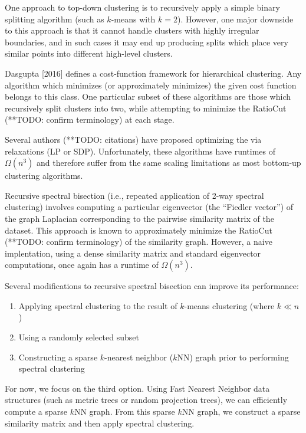 \documentclass[11pt]{article}
\begin{document}
One approach to top-down clustering is to recursively apply a simple binary splitting algorithm (such as $k$-means with $k=2$).
However, one major downside to this approach is that it cannot handle clusters with highly irregular boundaries, and in such cases it may end up producing splits which place very similar points into different high-level clusters.

Dasgupta [2016] defines a cost-function framework for hierarchical clustering.
Any algorithm which minimizes (or approximately minimizes) the given cost function belongs to this class.
One particular subset of these algorithms are those which recursively split clusters into two, while attempting to minimize the RatioCut (**TODO: confirm terminology) at each stage.

Several authors (**TODO: citations) have proposed optimizing the via relaxations (LP or SDP).
Unfortunately, these algorithms have runtimes of $\Omega(n^3)$ and therefore suffer from the same scaling limitations as most bottom-up clustering algorithms.

Recursive spectral bisection (i.e., repeated application of 2-way spectral clustering) involves computing a particular eigenvector (the ``Fiedler vector'') of the graph Laplacian corresponding to the pairwise similarity matrix of the dataset.
This approach is known to approximately minimize the RatioCut (**TODO: confirm terminology) of the similarity graph.
However, a naive implentation, using a dense similarity matrix and standard eigenvector computations, once again has a runtime of $\Omega(n^3)$.

Several modifications to recursive spectral bisection can improve its performance:
\begin{enumerate}
    \item Applying spectral clustering to the result of $k$-means clustering (where $k \ll n$)
    \item Using a randomly selected subset
    \item Constructing a sparse $k$-nearest neighbor ($k$NN) graph prior to performing spectral clustering
\end{enumerate}

For now, we focus on the third option. 
Using Fast Nearest Neighbor data structures (such as metric trees or random projection trees), we can efficiently compute a sparse $k$NN graph.
From this sparse $k$NN graph, we construct a sparse similarity matrix and then apply spectral clustering.
\end{document}

